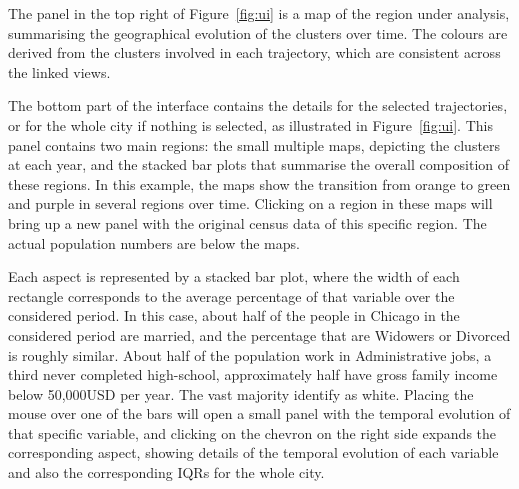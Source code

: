 The panel in the top right of Figure~\ref{fig:ui} is a map of the region under
analysis, summarising the geographical evolution of the clusters over time.  The
colours are derived from the clusters involved in each trajectory, which are
consistent across the linked views. 

The bottom part of the interface contains the details for the selected
trajectories, or for the whole city if nothing is selected, as illustrated in
Figure~\ref{fig:ui}. This panel contains two main regions: the small multiple
maps, depicting the clusters at each year, and the stacked bar plots that
summarise the overall composition of these regions. In this example, the maps
show the transition from orange to green and purple in several regions over
time. Clicking on a region in these maps will bring up a new panel with the
original census data of this specific region. The actual population numbers are
below the maps.

Each aspect is represented by a stacked bar plot, where the width of each
rectangle corresponds to the average percentage of that variable over the
considered period. In this case, about half of the people in Chicago in the
considered period are married, and the percentage that are Widowers or Divorced
is roughly similar. About half of the population work in Administrative jobs, a
third never completed high-school, approximately half have gross family income
below 50,000USD per year. The vast majority identify as white. Placing the mouse
over one of the bars will open a small panel with the temporal evolution of that
specific variable, and clicking on the chevron on the right side expands the
corresponding aspect, showing details of the temporal evolution of each variable
and also the corresponding IQRs for the whole city.